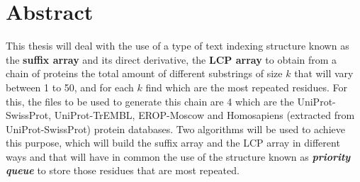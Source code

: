\chapter*{Abstract}

This thesis will deal with the use of a type of text indexing structure known as the \textbf {suffix array} and its direct derivative, the \textbf{LCP array} to obtain from a chain of proteins the total amount of different substrings of size $k$ that will vary between 1 to 50, and for each $k$ find which are the most repeated residues. For this, the files to be used to generate this chain are 4 which are the UniProt-SwissProt, UniProt-TrEMBL, EROP-Moscow and Homosapiens (extracted from UniProt-SwissProt) protein databases. Two algorithms will be used to achieve this purpose, which will build the suffix array and the LCP array in different ways and that will have in common the use of the structure known as \textbf{\textit{priority queue}} to store those residues that are most repeated.
